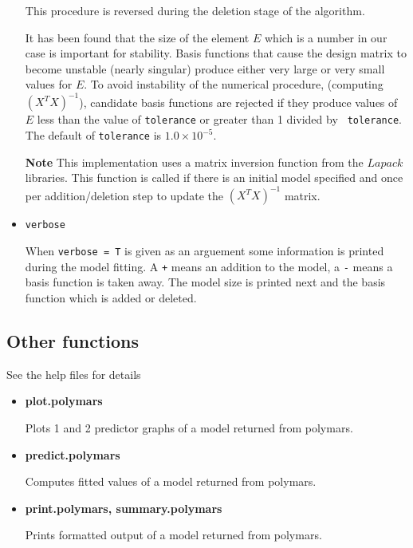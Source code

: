 \begin{itemize}
This procedure is reversed during the deletion stage of the algorithm.

It has been found that the size of the element $E$ which is a number
in our case is important for stability. Basis functions that cause the
design matrix to become unstable (nearly singular) produce either very
large or very small values for $E$. To avoid instability of the
numerical procedure, (computing $(X^TX)^{-1}$), candidate basis
functions are rejected if they produce values of $E$ less than the
value of {\tt tolerance} or greater than 1 divided by {\tt
tolerance}.
The default of {\tt tolerance} is $1.0\times 10^{-5}$.

{\bf Note} This implementation uses a matrix inversion function from
the $Lapack$ libraries. This function is called if there is an initial
model specified and once per addition/deletion step to update the
$(X^TX)^{-1}$ matrix.


\item {\tt verbose} 

When {\tt verbose  = T} is given as an arguement
some information is printed during the model fitting. A {\tt +} means
an addition to the model, a {\tt -} means a basis function is taken
away. The model size is printed next and the basis function which is added or
deleted.
\end{itemize}
\subsection{Other functions}
See the help files for details
\begin{itemize}
\item{\bf plot.polymars} 

Plots 1 and 2 predictor graphs of a model returned from polymars.

\item{\bf predict.polymars}

Computes fitted values of a model returned from polymars.

\item{\bf print.polymars, summary.polymars}

Prints formatted output of a model returned from polymars.

\end{itemize}
